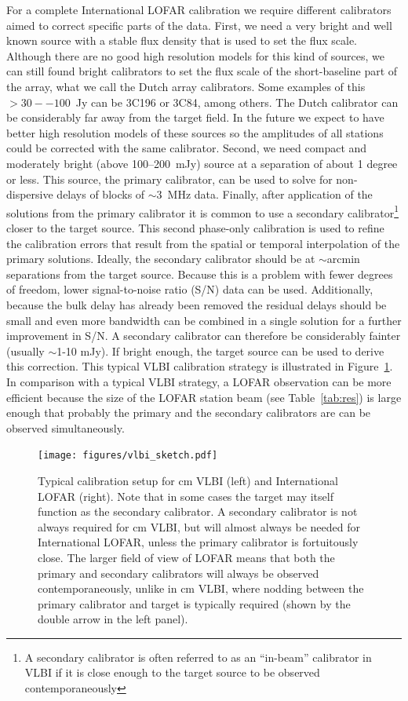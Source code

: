 \documentclass[graybox]{svmult}
\begin{document}
For a complete International LOFAR calibration we require different calibrators
aimed to correct specific parts of the data. First, we need a very bright and
well known source with a stable flux density that is used to set the flux scale.
Although there are no good high resolution models for this kind of sources, we
can still found bright calibrators to set the flux scale of the short-baseline
part of the array, what we call the Dutch array calibrators. Some examples of
this $>30--100$~Jy can be 3C196 or 3C84, among others. The Dutch calibrator can
be considerably far away from the target field. In the future we expect to have
better high resolution models of these sources so the amplitudes of all stations
could be corrected with the same calibrator. Second, we need compact and
moderately bright (above 100--200~mJy) source at a separation of about 1 degree
or less. This source, the primary calibrator, can be used to solve for
non-dispersive delays of blocks of $\sim3$~MHz data. Finally, after application
of the solutions from the primary calibrator it is common to use a secondary
calibrator\footnote{A secondary calibrator is often referred to as an
``in-beam'' calibrator in VLBI if it is close enough to the target source to be
observed contemporaneously} closer to the target source. This second phase-only
calibration is used to refine the calibration errors that result from the
spatial or temporal interpolation of the primary solutions.  Ideally, the
secondary calibrator should be at $\sim$arcmin separations from the target
source.  Because this is a problem with fewer degrees of freedom, lower
signal-to-noise ratio (S/N) data can be used.  Additionally, because the bulk
delay has already been removed the residual delays should be small and even more
bandwidth can be combined in a single solution for a further improvement in S/N.
A secondary calibrator can therefore be considerably fainter (usually $\sim$1-10
mJy). If bright enough, the target source can be used to derive this correction.
This typical VLBI calibration strategy is illustrated in
Figure~\ref{fig:calstrategy}. In comparison with a typical VLBI strategy, a
LOFAR observation can be more efficient because the size of the LOFAR station
beam (see Table~\ref{tab:res}) is large enough that probably the primary and the
secondary calibrators are can be observed simultaneously.

\begin{figure}[] %
\center 
\texttt{[image: figures/vlbi\_sketch.pdf]}
\caption{Typical calibration setup for cm VLBI (left) and International LOFAR
(right).  Note that in some cases the target may itself function as the
secondary calibrator.  A secondary calibrator is not always required for cm
VLBI, but will almost always be needed for International LOFAR, unless the
primary calibrator is fortuitously close.  The larger field of view of LOFAR
means that both the primary and secondary calibrators will always be observed
contemporaneously, unlike in cm VLBI, where nodding between the primary 
calibrator and target is typically required (shown by the double arrow in the
left panel).}
\label{fig:calstrategy}
\end{figure}
\end{document}

